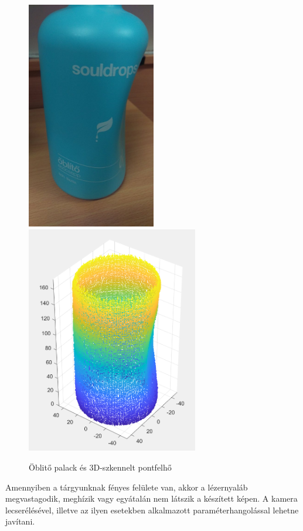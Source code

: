 \documentclass[12pt,a4paper]{article}
\begin{document}
\begin{figure}[h!]
	\begin{center}
		\includegraphics[height=10cm]{images/oblito1}
		\includegraphics[height=10cm]{images/oblito2}
	\end{center}
	\caption{Öblitő palack és 3D-szkennelt pontfelhő}
\end{figure}
Amennyiben a tárgyunknak fényes felülete van, akkor a lézernyaláb megvastagodik, meghízik vagy egyátalán nem látszik a készített képen. A kamera lecserélésével, illetve az ilyen esetekben alkalmazott paraméterhangolással lehetne javítani.\\[10pt]
\end{document}
